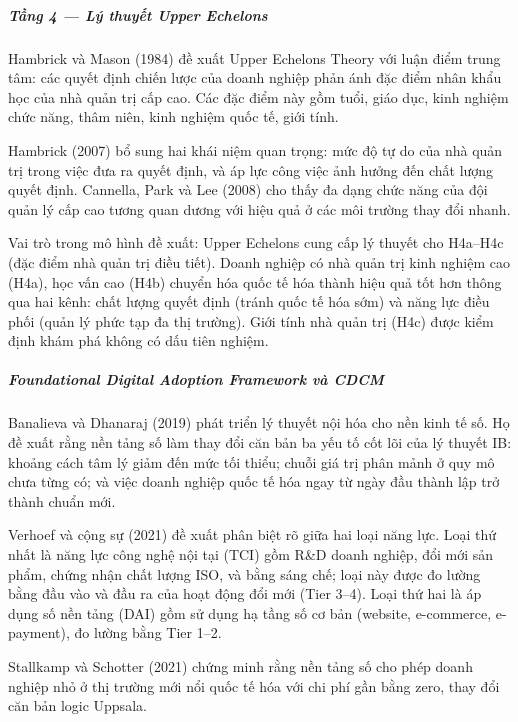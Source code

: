 \documentclass[12pt,a4paper]{article}
\begin{document}
\hypertarget{tux1ea7ng-4--luxfd-thuyux1ebft-upper-echelons}{%
\subparagraph{Tầng 4 --- Lý thuyết Upper
Echelons}\label{tux1ea7ng-4--luxfd-thuyux1ebft-upper-echelons}}

Hambrick và Mason (1984) đề xuất Upper Echelons Theory với luận điểm
trung tâm: các quyết định chiến lược của doanh nghiệp phản ánh đặc điểm
nhân khẩu học của nhà quản trị cấp cao. Các đặc điểm này gồm tuổi, giáo
dục, kinh nghiệm chức năng, thâm niên, kinh nghiệm quốc tế, giới tính.

Hambrick (2007) bổ sung hai khái niệm quan trọng: mức độ tự do của nhà
quản trị trong việc đưa ra quyết định, và áp lực công việc ảnh hưởng đến
chất lượng quyết định. Cannella, Park và Lee (2008) cho thấy đa dạng
chức năng của đội quản lý cấp cao tương quan dương với hiệu quả ở các
môi trường thay đổi nhanh.

Vai trò trong mô hình đề xuất: Upper Echelons cung cấp lý thuyết cho
H4a--H4c (đặc điểm nhà quản trị điều tiết). Doanh nghiệp có nhà quản trị
kinh nghiệm cao (H4a), học vấn cao (H4b) chuyển hóa quốc tế hóa thành
hiệu quả tốt hơn thông qua hai kênh: chất lượng quyết định (tránh quốc
tế hóa sớm) và năng lực điều phối (quản lý phức tạp đa thị trường). Giới
tính nhà quản trị (H4c) được kiểm định khám phá không có dấu tiên
nghiệm.

\hypertarget{foundational-digital-adoption-framework-vuxe0-cdcm}{%
\subparagraph{Foundational Digital Adoption Framework và
CDCM}\label{foundational-digital-adoption-framework-vuxe0-cdcm}}

Banalieva và Dhanaraj (2019) phát triển lý thuyết nội hóa cho nền kinh
tế số. Họ đề xuất rằng nền tảng số làm thay đổi căn bản ba yếu tố cốt
lõi của lý thuyết IB: khoảng cách tâm lý giảm đến mức tối thiểu; chuỗi
giá trị phân mảnh ở quy mô chưa từng có; và việc doanh nghiệp quốc tế
hóa ngay từ ngày đầu thành lập trở thành chuẩn mới.

Verhoef và cộng sự (2021) đề xuất phân biệt rõ giữa hai loại năng lực.
Loại thứ nhất là năng lực công nghệ nội tại (TCI) gồm R\&D doanh nghiệp,
đổi mới sản phẩm, chứng nhận chất lượng ISO, và bằng sáng chế; loại này
được đo lường bằng đầu vào và đầu ra của hoạt động đổi mới (Tier 3--4).
Loại thứ hai là áp dụng số nền tảng (DAI) gồm sử dụng hạ tầng số cơ bản
(website, e-commerce, e-payment), đo lường bằng Tier 1--2.

Stallkamp và Schotter (2021) chứng minh rằng nền tảng số cho phép doanh
nghiệp nhỏ ở thị trường mới nổi quốc tế hóa với chi phí gần bằng zero,
thay đổi căn bản logic Uppsala.
\end{document}
